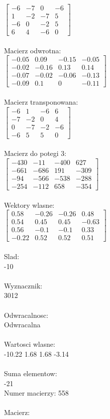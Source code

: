 \documentclass[a4paper,12pt]{article}
\begin{document}
$\begin{bmatrix} -6&-7&0&-6\\1&-2&-7&5\\-6&0&-2&5\\6&4&-6&0 \end{bmatrix}$
\\
\\
Macierz odwrotna:\\

$\begin{bmatrix} -0.05&0.09&-0.15&-0.05\\-0.02&-0.16&0.13&0.14\\-0.07&-0.02&-0.06&-0.13\\-0.09&0.1&0&-0.11 \end{bmatrix}$
\\
\\
Macierz transponowana:\\

$\begin{bmatrix} -6&1&-6&6\\-7&-2&0&4\\0&-7&-2&-6\\-6&5&5&0 \end{bmatrix}$
\\
\\
Macierz do potegi 3:\\

$\begin{bmatrix} -430&-11&-400&627\\-661&-686&191&-309\\-94&-566&-538&-288\\-254&-112&658&-354 \end{bmatrix}$
\\
\\
Wektory wlasne:\\

$\begin{bmatrix} 0.58&-0.26&-0.26&0.48\\0.54&0.45&0.45&-0.63\\0.56&-0.1&-0.1&0.33\\-0.22&0.52&0.52&0.51 \end{bmatrix}$
\\
\\
Slad:\\
-10
\\
\\
Wyznacznik:\\
3012
\\
\\
Odwracalnosc:\\
Odwracalna
\\
\\
Wartosci wlasne:\\
-10.22 1.68 1.68 -3.14
\\
\\
Suma elementow:\\
-21
\\
\newpage
Numer macierzy:
558
\\
\\
Macierz:\\
\end{document}
